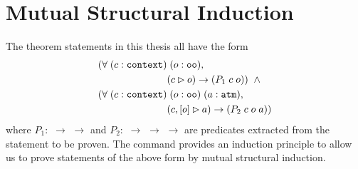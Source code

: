\section{Mutual Structural Induction}
\label{sec:induction}

%
%
The theorem statements in this thesis all have the form
\begin{align*}
(\forall \; (c : \sltm{context}) & \; (o : \sltm{oo}), \\
& (\seqsl[c]{o}) \rightarrow (P_1 \; c \; o)) \;\; \wedge \\
(\forall \; (c : \sltm{context}) & \; (o : \sltm{oo}) \; (a : \sltm{atm}), \\
& (\bchsl[c]{o}{a}) \rightarrow (P_2 \; c \; o \; a))
\end{align*}
where $P_1 :$  $\rightarrow$  $\rightarrow$  and $P_2 :$  $\rightarrow$  $\rightarrow$  $\rightarrow$  are predicates extracted from the statement to be proven. The  command provides an induction principle to allow us to prove statements of the above form by mutual structural induction.

